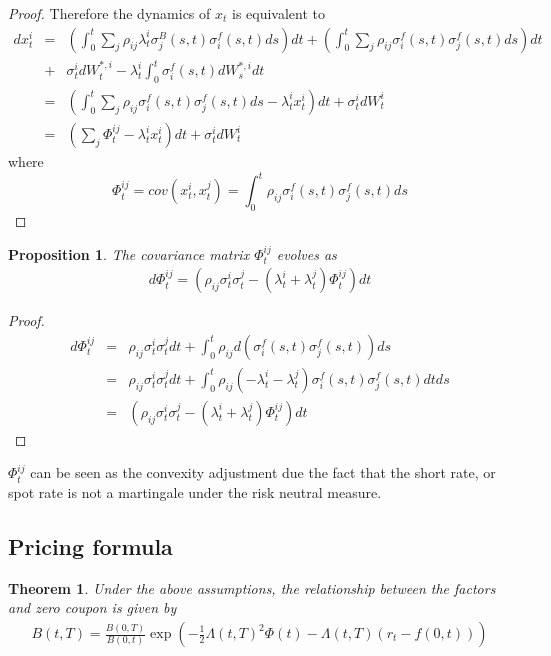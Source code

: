 \documentclass[10pt]{article}
\theoremstyle{plain}
\newtheorem{theorem}{Theorem}[section]
\newtheorem{prop}{Proposition}[section]
\numberwithin{equation}{section}
\numberwithin{table}{section}
\newcommand{\prt}[1]{\left( #1 \right)}  %
\begin{document}
\begin{proof}
Therefore the dynamics of $x_{t}$ is equivalent to
\begin{eqnarray*}
    dx_{t}^{i} &=& \prt{ \int_{0}^{t}\underset{j}{\sum }\rho _{ij}\lambda
    _{t}^{i}\sigma _{j}^{B}(s,t)\sigma _{i}^{f}(s,t)ds} dt +  \prt{\int_{0}^{t}\underset{j}
    {\sum }\rho _{ij}\sigma _{i}^{f}(s,t)\sigma _{j}^{f}(s,t)ds}dt \\
    &+&\sigma^i_t d W^{*,i}_t -\lambda _{t}^{i}\int_{0}^{t}\sigma
    _{i}^{f}(s,t)dW_{s}^{*,i}dt  \\
    &=& \prt{\int_{0}^{t}\underset{j}{\sum }\rho _{ij}\sigma
    _{i}^{f}(s,t)\sigma _{j}^{f}(s,t)ds-\lambda _{t}^{i}x_{t}^{i}}dt+\sigma
    _{t}^{i}dW_{t}^{i} \\
    &=&(\underset{j}{\sum }\Phi _{t}^{ij}-\lambda _{t}^{i}x_{t}^{i})dt+\sigma
    _{t}^{i}dW_{t}^{i}
\end{eqnarray*}
where
\[
    \Phi _{t}^{ij}=cov(x_{t}^{i},x_{t}^{j})=\int_{0}^{t}\rho _{ij}\sigma
    _{i}^{f}(s,t)\sigma _{j}^{f}(s,t)ds   
\]
\end{proof}


\begin{prop}
    The covariance matrix $\Phi _{t}^{ij}$ evolves as 
    \begin{eqnarray}
        d\Phi _{t}^{ij} = (\rho _{ij}\sigma _{t}^{i}\sigma _{t}^{j}-(\lambda _{t}^{i}+\lambda
        _{t}^{j})\Phi _{t}^{ij})dt  \label{phi_SDE}
    \end{eqnarray}
\end{prop}
\begin{proof}
\begin{eqnarray*}
    d\Phi _{t}^{ij} &=&\rho _{ij}\sigma _{t}^{i}\sigma
    _{t}^{j}dt+\int_{0}^{t}\rho _{ij}d(\sigma _{i}^{f}(s,t)\sigma
    _{j}^{f}(s,t))ds \\
    &=&\rho _{ij}\sigma _{t}^{i}\sigma _{t}^{j}dt+\int_{0}^{t}\rho
    _{ij}(-\lambda _{t}^{i}-\lambda _{t}^{j})\sigma _{i}^{f}(s,t)\sigma
    _{j}^{f}(s,t)dtds \\
    &=&(\rho _{ij}\sigma _{t}^{i}\sigma _{t}^{j}-(\lambda _{t}^{i}+\lambda
    _{t}^{j})\Phi _{t}^{ij})dt
\end{eqnarray*}
\end{proof}

$\Phi^{ij}_{t}$ can be seen as the convexity adjustment due the fact that
the short rate, or spot rate is not a martingale under the risk neutral
measure.

\subsection{Pricing formula}
\begin{theorem}
Under the above assumptions, the
relationship between the factors and zero coupon is given by
\begin{eqnarray}
    B(t,T) = \frac{B(0,T)}{B(0,t)}\exp\left( -\frac{1}{2}\Lambda(t,T)^2\Phi(t) -
    \Lambda(t,T)(r_{t}-f(0,t)) \right)  \label{rec_fomula}
\end{eqnarray}
\end{theorem}
\end{document}
